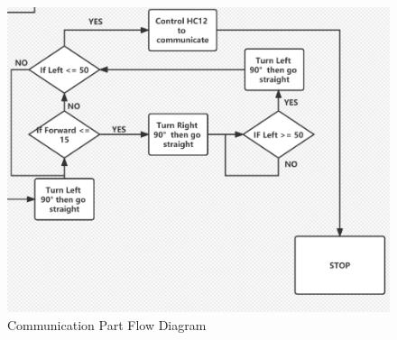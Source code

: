 \documentclass[12pt, a4paper, oneside]{report}
\begin{document}
\begin{figure}[H]
        \centering
        \includegraphics[scale=0.42]{pic/Patio 2/Fig12.png}
        \caption{Communication Part Flow Diagram}
        \label{cpfd}
\end{figure}
\end{document}
